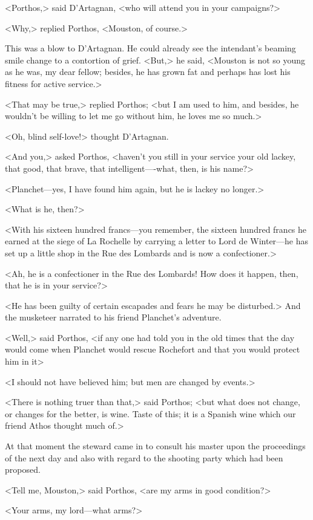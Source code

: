 <Porthos,> said D'Artagnan, <who will attend you in your campaigns?>

<Why,> replied Porthos, <Mouston, of course.>

This was a blow to D'Artagnan. He could already see the intendant's beaming smile change to a contortion of grief. <But,> he said, <Mouston is not so young as he was, my dear fellow; besides, he has grown fat and perhaps has lost his fitness for active service.>

<That may be true,> replied Porthos; <but I am used to him, and besides, he wouldn't be willing to let me go without him, he loves me so much.>

<Oh, blind self-love!> thought D'Artagnan.

<And you,> asked Porthos, <haven't you still in your service your old lackey, that good, that brave, that intelligent—-what, then, is his name?>

<Planchet—yes, I have found him again, but he is lackey no longer.>

<What is he, then?>

<With his sixteen hundred francs—you remember, the sixteen hundred francs he earned at the siege of La Rochelle by carrying a letter to Lord de Winter—he has set up a little shop in the Rue des Lombards and is now a confectioner.>

<Ah, he is a confectioner in the Rue des Lombards! How does it happen, then, that he is in your service?>

<He has been guilty of certain escapades and fears he may be disturbed.> And the musketeer narrated to his friend Planchet's adventure.

<Well,> said Porthos, <if any one had told you in the old times that the day would come when Planchet would rescue Rochefort and that you would protect him in it\longdash>

<I should not have believed him; but men are changed by events.>

<There is nothing truer than that,> said Porthos; <but what does not change, or changes for the better, is wine. Taste of this; it is a Spanish wine which our friend Athos thought much of.>

At that moment the steward came in to consult his master upon the proceedings of the next day and also with regard to the shooting party which had been proposed.

<Tell me, Mouston,> said Porthos, <are my arms in good condition?>

<Your arms, my lord—what arms?>

